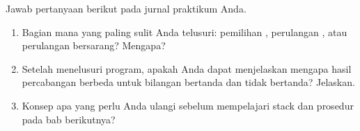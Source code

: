\begin{refleksibox}
\vspace{1.1em}
Jawab pertanyaan berikut pada jurnal praktikum Anda.
\begin{enumerate}
    \item Bagian mana yang paling sulit Anda telusuri: pemilihan
          , perulangan , atau perulangan
          bersarang? Mengapa?
    \item Setelah menelusuri program, apakah Anda dapat menjelaskan
          mengapa hasil percabangan berbeda untuk bilangan bertanda
          dan tidak bertanda? Jelaskan.
    \item Konsep apa yang perlu Anda ulangi sebelum mempelajari
          stack dan prosedur pada bab berikutnya?
\end{enumerate}
\end{refleksibox}
